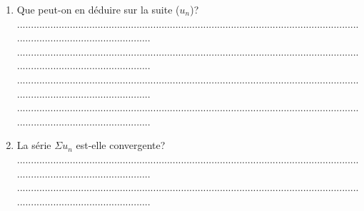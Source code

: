 \documentclass{article}
\begin{document}
\begin{footnotesize}
\begin{enumerate}
\begin{enumerate}
        ...........................................................................................................................................................................\newline
        ...........................................................................................................................................................................\newline
        ...........................................................................................................................................................................\newline
        ...........................................................................................................................................................................\newline\newline
        \item Que peut-on en déduire sur la suite ($u_{n}$)?\newline\newline
        ...........................................................................................................................................................................\newline
        ...........................................................................................................................................................................\newline
        ...........................................................................................................................................................................\newline
        ...........................................................................................................................................................................\newline\newline
        \item La série $\Sigma u_{n}$ est-elle convergente?\newline\newline
        ...........................................................................................................................................................................\newline
        ...........................................................................................................................................................................\newline

\end{enumerate}
\end{enumerate}
\end{footnotesize}
\end{document}
